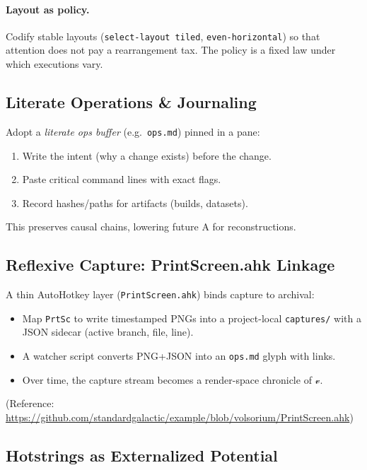 \documentclass[12pt,a4paper]{article}
\theoremstyle{plain}
\theoremstyle{definition}
\theoremstyle{remark}
\newcommand{\vfield}{\mathcal{v}}
\newcommand{\AI}{\mathrm{A}}
\begin{document}
\paragraph{Layout as policy.}
Codify stable layouts (\verb|select-layout tiled|, \verb|even-horizontal|) so that attention does not pay a rearrangement tax. The policy is a fixed law under which executions vary.

\subsection{Literate Operations \& Journaling}
Adopt a \emph{literate ops buffer} (e.g.\ \verb|ops.md|) pinned in a pane:
\begin{enumerate}
  \item Write the intent (why a change exists) before the change.
  \item Paste critical command lines with exact flags.
  \item Record hashes/paths for artifacts (builds, datasets).
\end{enumerate}
This preserves causal chains, lowering future $\AI$ for reconstructions.

\subsection{Reflexive Capture: PrintScreen.ahk Linkage}
A thin AutoHotkey layer (\texttt{PrintScreen.ahk}) binds capture to archival:
\begin{itemize}
  \item Map \texttt{PrtSc} to write timestamped PNGs into a project-local \texttt{captures/} with a JSON sidecar (active branch, file, line).
  \item A watcher script converts PNG+JSON into an \verb|ops.md| glyph with links.
  \item Over time, the capture stream becomes a render-space chronicle of $\vfield$.
\end{itemize}
{\small (Reference: \url{https://github.com/standardgalactic/example/blob/volsorium/PrintScreen.ahk})}

\subsection{Hotstrings as Externalized Potential}
\label{subsec:hotstrings}
\end{document}
